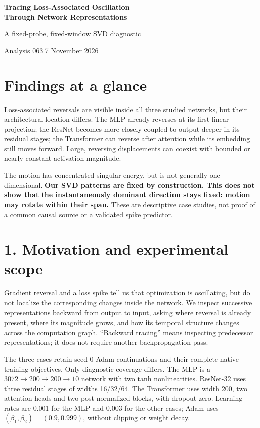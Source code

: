 \documentclass[11pt,a4paper]{article}
\newcommand{\tightsection}[1]{\vspace{3pt}\section*{#1}\vspace{-4pt}}
\begin{document}
\thispagestyle{plain}
{\LARGE\bfseries Tracing Loss-Associated Oscillation\\[3pt]
Through Network Representations\par}
{\large A fixed-probe, fixed-window SVD diagnostic\par}
{\small Analysis 063 \hfill 7 November 2026}

\tightsection{Findings at a glance}
Loss-associated reversals are visible inside all three studied networks, but
their architectural location differs. The MLP already reverses at its first
linear projection; the ResNet becomes more closely coupled to output deeper in
its residual stages; the Transformer can reverse after attention while its
embedding still moves forward. Large, reversing displacements can coexist with
bounded or nearly constant activation magnitude.

The motion has concentrated singular energy, but is not generally one-dimensional.
\textbf{Our SVD patterns are fixed by construction. This does not show that the
instantaneously dominant direction stays fixed: motion may rotate within their
span.} These are descriptive case studies, not proof of a common causal source
or a validated spike predictor.

\tightsection{1. Motivation and experimental scope}
Gradient reversal and a loss spike tell us that optimization is oscillating, but
do not localize the corresponding changes inside the network. We inspect
successive representations backward from output to input, asking where reversal
is already present, where its magnitude grows, and how its temporal structure
changes across the computation graph. ``Backward tracing'' means inspecting
predecessor representations; it does not require another backpropagation pass.

The three cases retain seed-0 Adam continuations and their complete native
training objectives. Only diagnostic coverage differs. The MLP is a
$3072\!\to\!200\!\to\!200\!\to\!10$ network with two tanh nonlinearities.
ResNet-32 uses three residual stages of widths 16/32/64. The Transformer uses
width 200, two attention heads and two post-normalized blocks, with dropout zero.
Learning rates are 0.001 for the MLP and 0.003 for the other cases; Adam uses
$(\beta_1,\beta_2)=(0.9,0.999)$, without clipping or weight decay.
\end{document}
